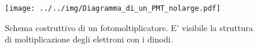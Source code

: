 \begin{figure}[h]\centering\texttt{[image: ../../img/Diagramma\_di\_un\_PMT\_nolarge.pdf]}\caption{Schema costruttivo di un fotomoltiplicatore. E' visibile la struttura di moltiplicazione degli elettroni con i dinodi.}\label{fig:Diagramma_di_un_PMT}\end{figure}
